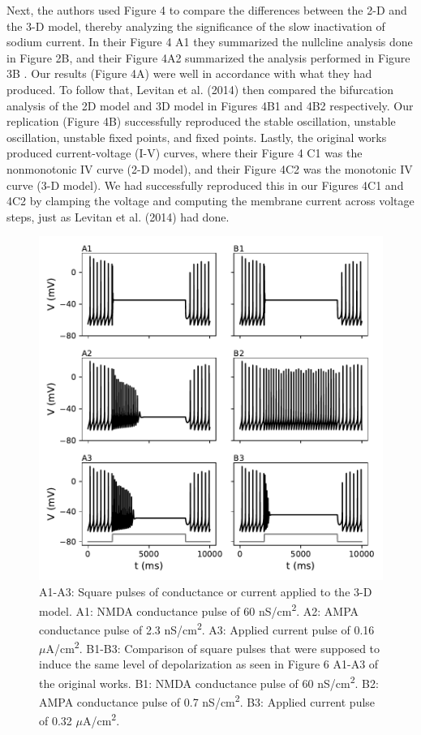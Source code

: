 Next, the authors used Figure 4 to compare the differences between the 2-D and the 3-D model, thereby analyzing the significance of the slow inactivation of sodium current. In their Figure 4 A1 they summarized the nullcline analysis done in Figure 2B, and their Figure 4A2 summarized the analysis performed in Figure 3B . Our results (Figure 4A) were well in accordance with what they had produced. To follow that, Levitan et al. (2014) then compared the bifurcation analysis of the 2D model and 3D model in Figures 4B1 and 4B2 respectively. Our replication (Figure 4B) successfully reproduced the stable oscillation, unstable oscillation, unstable fixed points, and fixed points. Lastly, the original works produced current-voltage (I-V) curves, where their Figure 4 C1 was the nonmonotonic IV curve (2-D model), and their Figure 4C2 was the monotonic IV curve (3-D model). We had successfully reproduced this in our Figures 4C1 and 4C2 by clamping the voltage and computing the membrane current across voltage steps, just as Levitan et al. (2014) had done.\\ 


\begin{figure}
	\centering
	\includegraphics[scale=0.7]{../figures/figure_6.pdf}
	\caption{A1-A3: Square pulses of conductance or current applied to the 3-D model. A1: NMDA conductance pulse of 60 nS/cm\textsuperscript{2}. A2: AMPA conductance pulse of 2.3 nS/cm\textsuperscript{2}. A3: Applied current pulse of 0.16 $\mu$A/cm\textsuperscript{2}. B1-B3: Comparison of square pulses that were supposed to induce the same level of depolarization as seen in Figure 6 A1-A3 of the original works. B1: NMDA conductance pulse of 60 nS/cm\textsuperscript{2}. B2: AMPA conductance pulse of 0.7 nS/cm\textsuperscript{2}. B3: Applied current pulse of 0.32 $\mu$A/cm\textsuperscript{2}. }
	\label{fig:6}
\end{figure}

